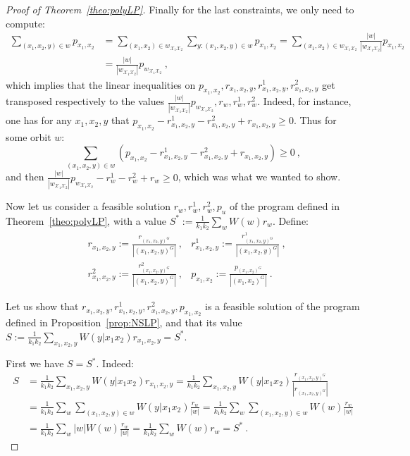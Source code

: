 \begin{proof}[Proof of Theorem~\ref{theo:polyLP}]
   Finally for the last constraints, we only need to compute:
   \begin{equation}
     \begin{aligned}
       \sum_{(x_1,x_2,y) \in w} p_{x_1,x_2} &= \sum_{(x_1,x_2) \in w_{\mathcal{X}_1\mathcal{X}_2}} \sum_{y : (x_1,x_2,y) \in w} p_{x_1,x_2} = \sum_{(x_1,x_2) \in w_{\mathcal{X}_1\mathcal{X}_2}} \frac{|w|}{|w_{\mathcal{X}_1\mathcal{X}_2}|} p_{x_1,x_2}\\
       &= \frac{|w|}{|w_{\mathcal{X}_1\mathcal{X}_2}|} p_{w_{\mathcal{X}_1\mathcal{X}_2}} \ ,
     \end{aligned}
   \end{equation}
   which implies that the linear inequalities on $p_{x_1,x_2}, r_{x_1,x_2,y}, r^1_{x_1,x_2,y}, r^2_{x_1,x_2,y}$ get transposed respectively to the values $\frac{|w|}{|w_{\mathcal{X}_1\mathcal{X}_2}|} p_{w_{\mathcal{X}_1\mathcal{X}_2}}, r_w, r^1_w, r^2_w$. Indeed, for instance, one has for any $x_1,x_2,y$ that $p_{x_1,x_2}- r^1_{x_1,x_2,y}- r^2_{x_1,x_2,y} + r_{x_1,x_2,y} \geq 0$. Thus for some orbit $w$:
   \[\sum_{(x_1,x_2,y) \in w}\left(p_{x_1,x_2}- r^1_{x_1,x_2,y}- r^2_{x_1,x_2,y} + r_{x_1,x_2,y}\right) \geq 0 \ ,\]
   and then $ \frac{|w|}{|w_{\mathcal{X}_1\mathcal{X}_2}|} p_{w_{\mathcal{X}_1\mathcal{X}_2}}- r^1_w- r^2_w + r_w \geq 0$, which was what we wanted to show.

   Now let us consider a feasible solution  $r_w,r^1_w,r^2_w,p_u$ of the program defined in Theorem~\ref{theo:polyLP}, with a value $S^*:=\frac{1}{k_1k_2}\sum_{w} W(w)r_w$. Define:
  \begin{equation}
    \begin{aligned}
      &r_{x_1,x_2,y} := \frac{r_{(x_1,x_2,y)^G}}{|(x_1,x_2,y)^G|} \ , &r^1_{x_1,x_2,y} := \frac{r^1_{(x_1,x_2,y)^G}}{|(x_1,x_2,y)^G|} \ ,\\
      &r^2_{x_1,x_2,y} :=\frac{r^2_{(x_1,x_2,y)^G}}{|(x_1,x_2,y)^G|} \ , &p_{x_1,x_2} := \frac{p_{(x_1,x_2)^G}}{|(x_1,x_2)^G|} \ .
    \end{aligned}
  \end{equation}

  Let us show that $r_{x_1,x_2,y},r^1_{x_1,x_2,y},r^2_{x_1,x_2,y},p_{x_1,x_2}$ is a feasible solution of the program defined in Proposition~\ref{prop:NSLP}, and that its value $S:=\frac{1}{k_1k_2} \sum_{x_1,x_2,y} W(y|x_1x_2)r_{x_1,x_2,y} = S^*$.

  First we have $S = S^*$. Indeed:
   \begin{equation}
     \begin{aligned}
       S &= \frac{1}{k_1k_2}\sum_{x_1,x_2,y} W(y|x_1x_2) r_{x_1,x_2,y} = \frac{1}{k_1k_2}\sum_{x_1,x_2,y} W(y|x_1x_2) \frac{r_{(x_1,x_2,y)^G}}{|r_{(x_1,x_2,y)^G}|}\\
       &= \frac{1}{k_1k_2}\sum_{w} \sum_{(x_1,x_2,y) \in w} W(y|x_1x_2) \frac{r_w}{|w|} = \frac{1}{k_1k_2}\sum_{w} \sum_{(x_1,x_2,y) \in w} W(w) \frac{r_w}{|w|}\\
       &= \frac{1}{k_1k_2}\sum_{w} |w| W(w) \frac{r_w}{|w|} = \frac{1}{k_1k_2}\sum_{w} W(w)r_w = S^* \ .
     \end{aligned}
  \end{equation}


\end{proof}
